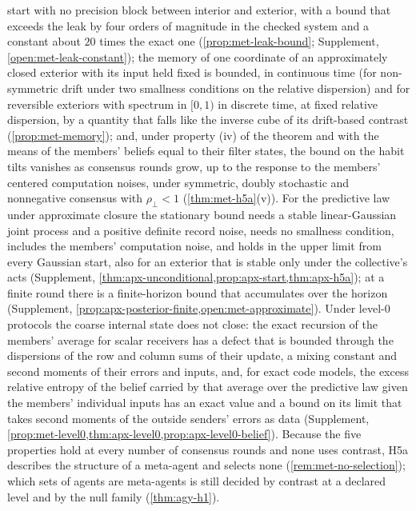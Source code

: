 start with no precision block between interior and exterior, with a bound that exceeds the leak by four orders of magnitude in the checked system and a constant about $20$ times the exact one (\cref{prop:met-leak-bound}; Supplement, \cref{open:met-leak-constant}); the memory of one coordinate of an approximately closed exterior with its input held fixed is bounded, in continuous time (for non-symmetric drift under two smallness conditions on the relative dispersion) and for reversible exteriors with spectrum in $[0,1)$ in discrete time, at fixed relative dispersion, by a quantity that falls like the inverse cube of its drift-based contrast (\cref{prop:met-memory}); and, under property (iv) of the theorem and with the means of the members' beliefs equal to their filter states, the bound on the habit tilts vanishes as consensus rounds grow, up to the response to the members' centered computation noises, under symmetric, doubly stochastic and nonnegative consensus with $\rho_\perp<1$ (\cref{thm:met-h5a}(v)). For the predictive law under approximate closure the stationary bound needs a stable linear-Gaussian joint process and a positive definite record noise, needs no smallness condition, includes the members' computation noise, and holds in the upper limit from every Gaussian start, also for an exterior that is stable only under the collective's acts (Supplement, \cref{thm:apx-unconditional,prop:apx-start,thm:apx-h5a}); at a finite round there is a finite-horizon bound that accumulates over the horizon (Supplement, \cref{prop:apx-posterior-finite,open:met-approximate}). Under level-0 protocols the coarse internal state does not close: the exact recursion of the members' average for scalar receivers has a defect that is bounded through the dispersions of the row and column sums of their update, a mixing constant and second moments of their errors and inputs, and, for exact code models, the excess relative entropy of the belief carried by that average over the predictive law given the members' individual inputs has an exact value and a bound on its limit that takes second moments of the outside senders' errors as data (Supplement, \cref{prop:met-level0,thm:apx-level0,prop:apx-level0-belief}). Because the five properties hold at every number of consensus rounds and none uses contrast, H5a describes the structure of a meta-agent and selects none (\cref{rem:met-no-selection}); which sets of agents are meta-agents is still decided by contrast at a declared level and by the null family (\cref{thm:agy-h1}).

